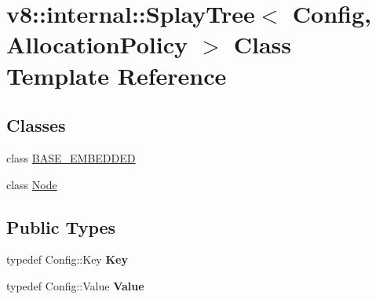 \hypertarget{classv8_1_1internal_1_1_splay_tree}{}\section{v8\+:\+:internal\+:\+:Splay\+Tree$<$ Config, Allocation\+Policy $>$ Class Template Reference}
\label{classv8_1_1internal_1_1_splay_tree}
\subsection*{Classes}
\begin{DoxyCompactItemize}
\item 
class \hyperlink{classv8_1_1internal_1_1_splay_tree_1_1_b_a_s_e___e_m_b_e_d_d_e_d}{B\+A\+S\+E\+\_\+\+E\+M\+B\+E\+D\+D\+E\+D}
\item 
class \hyperlink{classv8_1_1internal_1_1_splay_tree_1_1_node}{Node}
\end{DoxyCompactItemize}
\subsection*{Public Types}
\begin{DoxyCompactItemize}
\item 
\hypertarget{classv8_1_1internal_1_1_splay_tree_a37fb72d02bb9916a61b98b985bd376ba}{}typedef Config\+::\+Key {\bfseries Key}\label{classv8_1_1internal_1_1_splay_tree_a37fb72d02bb9916a61b98b985bd376ba}

\item 
\hypertarget{classv8_1_1internal_1_1_splay_tree_aa2d8e0e29b39457fa56226c8e18c41f7}{}typedef Config\+::\+Value {\bfseries Value}\label{classv8_1_1internal_1_1_splay_tree_aa2d8e0e29b39457fa56226c8e18c41f7}

\end{DoxyCompactItemize}

